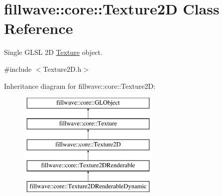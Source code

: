 \hypertarget{classfillwave_1_1core_1_1Texture2D}{}\section{fillwave\+:\+:core\+:\+:Texture2\+D Class Reference}
\label{classfillwave_1_1core_1_1Texture2D}


Single G\+L\+S\+L 2\+D \hyperlink{classfillwave_1_1core_1_1Texture}{Texture} object.  




{\ttfamily \#include $<$Texture2\+D.\+h$>$}

Inheritance diagram for fillwave\+:\+:core\+:\+:Texture2\+D\+:\begin{figure}[H]
\begin{center}
\leavevmode
\includegraphics[height=5.000000cm]{classfillwave_1_1core_1_1Texture2D}
\end{center}
\end{figure}
